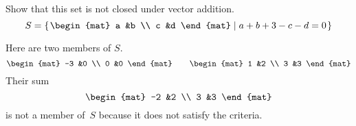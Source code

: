 \documentclass[answers, nolegalese, 11pt]{examjh}
\begin{document}
\begin{questions}
\question
Show that this set is not closed under vector addition.
\begin{equation*}
  S=\set{
    \begin{mat}
      a  &b \\
      c  &d
    \end{mat}
    \suchthat
    a+b+3-c-d=0}
\end{equation*}
\begin{solution}
Here are two members of $S$.
\begin{equation*}
\begin{mat}
  -3  &0 \\
  0   &0
\end{mat}
\qquad
\begin{mat}
  1 &2  \\
  3  &3
\end{mat}
\end{equation*}
Their sum
\begin{equation*}
\begin{mat}
  -2  &2  \\
   3  &3
\end{mat}
\end{equation*}
is not a member of~$S$
because it does not satisfy the criteria.
\end{solution}
\end{questions}
\end{document}
